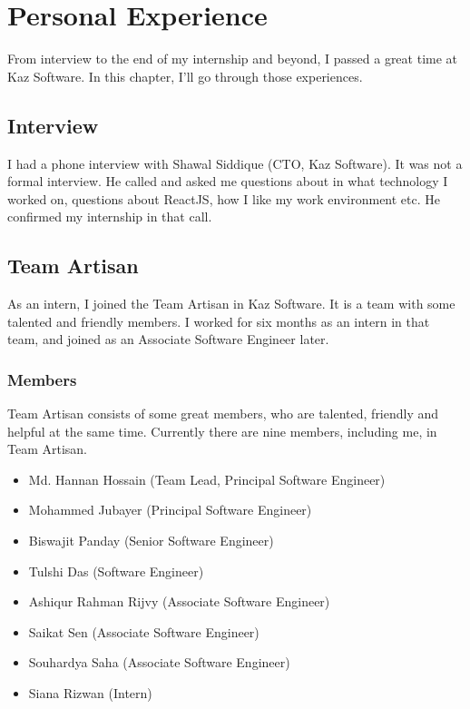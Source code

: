 \chapter{Personal Experience}

From interview to the end of my internship and beyond, I passed a great time at Kaz Software.
In this chapter, I'll go through those experiences.

\section{Interview}

I had a phone interview with Shawal Siddique (CTO, Kaz Software).
It was not a formal interview.
He called and asked me questions about in what technology I worked on, questions about ReactJS, how I like my work environment etc.
He confirmed my internship in that call.

\section{Team Artisan}

As an intern, I joined the Team Artisan in Kaz Software.
It is a team with some talented and friendly members.
I worked for six months as an intern in that team, and joined as an Associate Software Engineer later.

\subsection{Members}

Team Artisan consists of some great members, who are talented, friendly and helpful at the same time.
Currently there are nine members, including me, in Team Artisan.

\begin{itemize}
    \item Md. Hannan Hossain (Team Lead, Principal Software Engineer)
    \item Mohammed Jubayer (Principal Software Engineer)
    \item Biswajit Panday (Senior Software Engineer)
    \item Tulshi Das (Software Engineer)
    \item Ashiqur Rahman Rijvy (Associate Software Engineer)
    \item Saikat Sen (Associate Software Engineer)
    \item Souhardya Saha (Associate Software Engineer)
    \item Siana Rizwan (Intern) 
\end{itemize}

